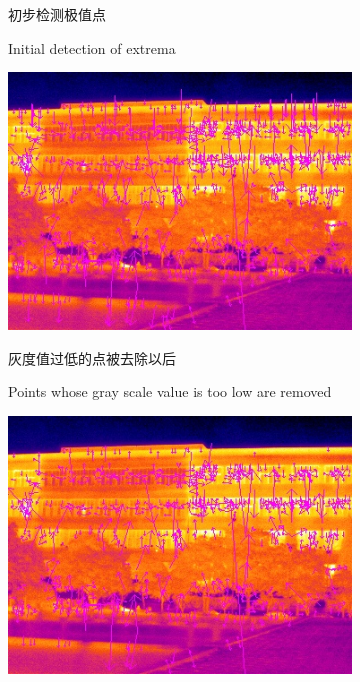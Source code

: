 \documentclass[10.5pt,a4paper]{article}
\numberwithin{equation}{section}
\numberwithin{figure}{section}
\numberwithin{table}{section}
\begin{document}
\begin{figure}[htbp]
\begin{subfigure}[b]{.4\textwidth}
				\caption{初步检测极值点\label{noContrTh}}
				\addtocounter{subfigure}{-1}
				\caption{Initial detection of extrema}
	\end{subfigure}
	\begin{subfigure}[b]{.4\textwidth}
		\centering
				\includegraphics[width=\textwidth]{pictures/compareEdgeResponse/siftFeature918.jpg}
				\caption{灰度值过低的点被去除以后\label{noEdgeElimit}}
				\addtocounter{subfigure}{-1}
				\caption{Points whose gray scale value is too low are removed}
	\end{subfigure}
	\qquad
	\begin{subfigure}[b]{.4\textwidth}
		\centering
				\includegraphics[width=\textwidth]{pictures/compareEdgeResponse/siftFeature792.jpg}

\end{subfigure}
\end{figure}
\end{document}
